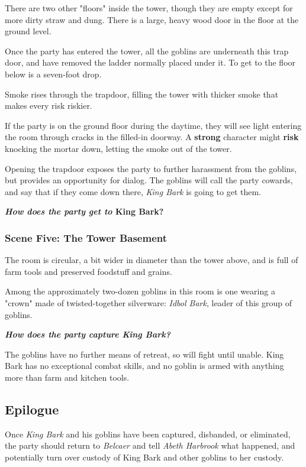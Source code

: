 \documentclass[11pt]{teraum_adventure}
\begin{document}
There are two other "floors" inside the tower, though they are empty
except for more dirty straw and dung. There is a large, heavy wood
door in the floor at the ground level.


Once the party has entered the tower, all the goblins are underneath
this trap door, and have removed the ladder normally placed under it.
To get to the floor below is a seven-foot drop.

Smoke rises through the trapdoor, filling the tower with thicker
smoke that makes every risk riskier.

If the party is on the ground floor during the daytime, they will see
light entering the room through cracks in the filled-in doorway. A
\textbf{strong} character might \textbf{risk} knocking the mortar down, letting the
smoke out of the tower.

Opening the trapdoor exposes the party to further harassment from the
goblins, but provides an opportunity for dialog. The goblins will
call the party cowards, and say that if they come down there, \emph{King
Bark} is going to get them.

\textbf{\emph{How does the party get to} King Bark?}
\subsubsection*{Scene Five: The Tower Basement}
\label{sec:org906715b}
The room is circular, a bit wider in diameter than the tower above,
and is full of farm tools and preserved foodstuff and grains.

Among the approximately two-dozen goblins in this room is one wearing
a "crown" made of twisted-together silverware: \emph{Idbol Bark}, leader of
this group of goblins.

\textbf{\emph{How does the party capture King Bark?}}

The goblins have no further means of retreat, so will fight until
unable. King Bark has no exceptional combat skills, and no goblin is
armed with anything more than farm and kitchen tools.
\subsection*{Epilogue}
\label{sec:orgfc8b35b}
Once \emph{King Bark} and his goblins have been captured, disbanded, or
eliminated, the party should return to \emph{Belcaer} and tell \emph{Abeth
Harbrook} what happened, and potentially turn over custody of King
Bark and other goblins to her custody.
\end{document}
